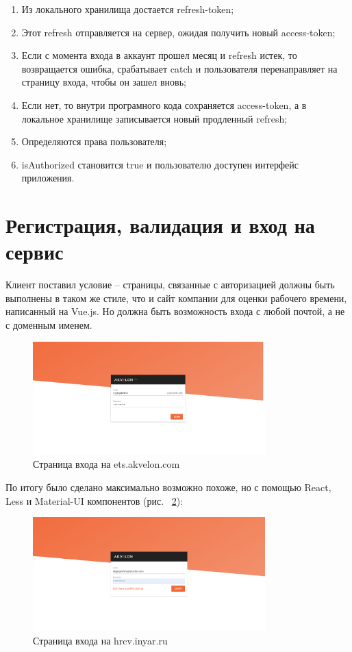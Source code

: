 \documentclass[a4paper,12pt]{diplom}
\begin{document}
\begin{enumerate}
  \item Из локального хранилища достается refresh-token;
  \item Этот refresh отправляется на сервер, ожидая получить новый access-token;
  \item Если с момента входа в аккаунт прошел месяц и refresh истек, то возвращается ошибка, срабатывает catch и пользователя перенаправляет на страницу входа, чтобы он зашел вновь;
  \item Если нет, то внутри програмного кода сохраняется access-token, а в локальное хранилище записывается новый продленный refresh;
  \item Определяются права пользователя;
  \item isAuthorized становится true и пользователю доступен интерфейс приложения.

\end{enumerate}

\section{Регистрация, валидация и вход на сервис}

Клиент поставил условие -- страницы, связанные с авторизацией должны быть выполнены в таком же стиле, что и сайт компании для
оценки рабочего времени, написанный на Vue.js. Но должна быть возможность входа с любой почтой, а не с доменным именем.

\begin{figure}[!ht]
	\centering
	\includegraphics[width=0.8\textwidth]{resources/ets.png}
	\caption{Страница входа на ets.akvelon.com}
	\label{fig:1}
\end{figure}

По итогу было сделано максимально возможно похоже, но с помощью React, Less и Material-UI компонентов (рис. ~\ref{2}):

\begin{figure}[!ht]
	\centering
	\includegraphics[width=0.8\textwidth]{resources/signin.png}
	\caption{Страница входа на hrcv.inyar.ru}
	\label{2}
\end{figure}
\end{document}
